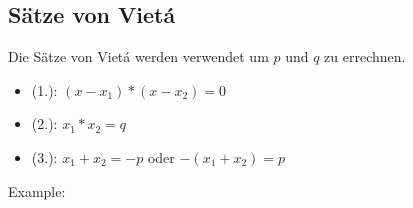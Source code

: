 \newpage
\subsection{Sätze von Vietá}

\hfill \break
Die Sätze von Vietá werden verwendet um $p$ und $q$ zu errechnen.

\hfill \break
\begin{itemize}
    \item (1.): $(x-x_1)*(x-x_2) = 0$
    \item (2.): $x_1*x_2 = q$
    \item (3.): $x_1+x_2 = -p$ oder $-(x_1+x_2) = p$
\end{itemize}

\hfill \break
Example:\\
\fboxrule=0.8pt 